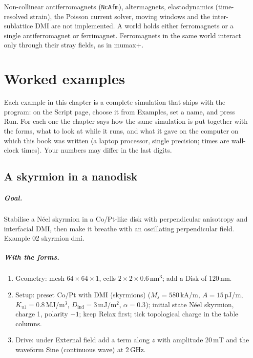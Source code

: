 \documentclass[11pt,a4paper,oneside]{book}
\newcommand{\code}[1]{\texttt{#1}}
\renewcommand{\_}{\textunderscore\allowbreak}
\newcommand{\menu}[1]{\textsf{#1}}
\begin{document}
Non-collinear antiferromagnets (\code{NcAfm}), altermagnets, elastodynamics (time-resolved strain), the Poisson
current solver, moving windows and the inter-sublattice DMI are not implemented. A world holds either
ferromagnets or a single antiferromagnet or ferrimagnet. Ferromagnets in the same world interact only through their
stray fields, as in mumax+.

\chapter{Worked examples}\label{ch:examples}

Each example in this chapter is a complete simulation that ships with the program: on the \menu{Script} page,
choose it from \menu{Examples}, set a name, and press \menu{Run}. For each one the chapter says how the same
simulation is put together with the forms, what to look at while it runs, and what it gave on the computer on
which this book was written (a laptop processor, single precision; times are wall-clock times). Your numbers
may differ in the last digits.

\section{A skyrmion in a nanodisk}

\paragraph{Goal.} Stabilise a N\'eel skyrmion in a Co/Pt-like disk with perpendicular anisotropy and interfacial
DMI, then make it breathe with an oscillating perpendicular field. Example \menu{02 skyrmion dmi}.

\paragraph{With the forms.}
\begin{enumerate}
\item \menu{Geometry}: mesh $64\times64\times1$, cells $2\times2\times0.6$\,nm$^3$; add a \menu{Disk} of
120\,nm.
\item \menu{Setup}: preset \menu{Co/Pt with DMI (skyrmions)} ($M_s = 580$\,kA/m, $A = 15$\,pJ/m,
$K_{u1} = 0.8$\,MJ/m$^3$, $D_\text{ind} = 3$\,mJ/m$^2$, $\alpha = 0.3$); initial state \menu{N\'eel skyrmion},
charge 1, polarity $-1$; keep \menu{Relax first}; tick \menu{topological charge} in the table columns.
\item \menu{Drive}: under \menu{External field} add a term along $z$ with amplitude 20\,mT and the waveform
\menu{Sine (continuous wave)} at 2\,GHz.
\end{enumerate}
\end{document}
